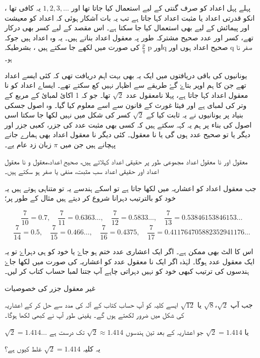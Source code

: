 پہلے پہل اعداد کو صرف گنتی کے لیے استعمال کیا جاتا تھا اور \(1,2,3,\dotsc\) یہ کافی تھا ، انکو قدرتی اعداد یا مثبت اعداد کہا جاتا ہے
تب یہ بات آشکار ہوئی کہ اعداد کو معیشت اور پیمائش کے لیے بھی استعمال کیا جا سکتا ہے۔ اس مقصد کے لیے کسر بھی درکار تھے، کسر اور عدد صحیح مشترکہ طور پہ معقول اعداد بناتے ہیں۔ یہ وہ اعداد ہیں جوکہ \(\frac{p}{q}\) کی صورت میں لکھے جا سکتے ہیں ، بشرطیکہ p    اورq  صحیح اعداد ہوں اور  q   صفر نا ہو۔

یونانیوں کی باقی دریافتوں میں ایک یہ بھی بہت اہم  دریافت تھی کہ کئی ایسے اعداد تھے جن کا ہم اوپر بتاۓ گۓ طریقے سے اظہار نہیں کع سکتے تھے۔ ایساے اعداد کو نا معقول اعداد کہا جاتا ہے، پہلا نامعقول عدد  \(\sqrt{2}\) تھا۔ جو کہ 1 اکائ لمبائ کے مربع کے وتر کی لمبای ہے اور فیثا غورث کے قانون سے اسے معلوم کیا گیا۔ وہ اصول جسکی بنیاد پر یونانیوں نے یہ ثابت کیا کے \(\sqrt{2}\) کسر کی شکل میں نہیں لکھا جا سکتا اسی اصول کی بناء پر ہم  یہ کہہ سکتے ہیں کہ کسی بھی مثبت عدد کی  جزر، کعبی جزر اور دیگر یا تو صحیح عدد ہوں گی یا نا معقول۔ کئی دیگر نا معقول اعداد بھی ہمارے جانے پہچانے ہیں جن میں  \(\pi\) زبان زد عام یے۔

معقول اور نا معقول اعداد مجموعی طور پر حقیقی اعداد کہلاتے ہیں، صحیح اعداد،معقول و نا معقول اعداد اور حقیقی اعداد سب مثبت، منفی یا صفر ہو سکتے ہیں۔

جب معقول اعداد کو اعشاریہ میں لکھا جاتا ہے تو اسکے ہندسے یہ تو متناہی ہوتے ہیں یہ خود کو بالترتیب دہرانا شروع کر دیتے ہیں مثال کے طور پر؛

\[\frac{7}{10}=0.7,\quad \frac{7}{11}=0.6363\dotsc,\quad\frac{7}{12}=0.5833\dotsc,\quad\frac{7}{13}=0.538 461 538 461 53\dotsc\]
\[\frac{7}{14}=0.5,\quad\frac{7}{15}=0.466\dotsc,\quad\frac{7}{16}=0.4375,\quad\frac{7}{17}=0.411 764 705 882 352941176\dotsc\]

اس کا الٹ بھی ممکن ہے۔ اگر ایک اعشاری عدد ختم ہو جاۓ یا خود کو ہی دہراۓ تو یہ ایک معقول عدد ہوگا۔ لہٰذہ اگر ایک نا معقول عدد کو اعشاریہ کی صورت میں لکھا جاۓ ہندسوں کی ترتیب کبھی خود کو نہیں دہراتی چاہے آپ جتنا لمبا حساب کتاب کر لیں۔


غیر معقول جزر کی خصوصیات

جب آپ \(\sqrt{2}\)،\(\sqrt{8}\) یا    \(\sqrt{12}\)    ایسے کلیہ کو آپ حساب کتاب کے آلہ کی مدد سے حل کر کے اعشاریہ کی شکل میں ضرور لکھتے ہوں گے۔ یقینی طور آپ نے کبھی لکھا ہوگا۔

\(\sqrt{2}=1.414\dotsc\)
 یا  
\(\sqrt{2}=1.414\)
جو اعشاریہ کے بعد تین ہندسوں
\(\sqrt{2}\approx 1.414\)
تک درست ہے
 
یہ کلیہ \(\sqrt{2}=1.414\) غلط کیوں ہے؟

